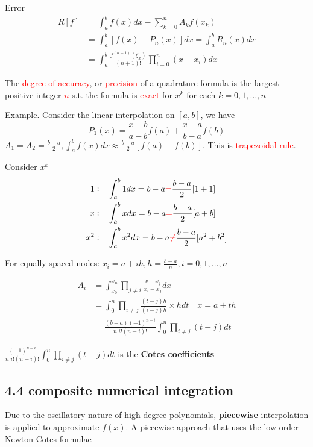 \documentclass[11pt]{article}
\begin{document}
Error
\begin{align*}
R[f]&=\int_a^bf(x)dx-\displaystyle\sum_{k=0}^nA_kf(x_k)\\
&=\int_a^b[f(x)-P_n(x)]dx=\int_a^bR_n(x)dx\\
&=\int_a^b\frac{f^{(n+1)}(\xi_x)}{(n+1)!}\displaystyle\prod_{i=0}^n(x-x_i)dx
\end{align*}

\begin{definition}
The \textcolor{red}{degree of accuracy}, or \textcolor{red}{precision} of a quadrature
formula is the largest positive integer \textcolor{red}{$n$}   s.t. 
the formula is \textcolor{red}{exact}
for $x^k$ for each $k=0,1,\dots,n$
\end{definition}

Example. Consider the linear interpolation on \([a,b]\), we have 
\begin{equation*}
P_1(x)=\frac{x-b}{a-b}f(a)+\frac{x-a}{b-a}f(b)
\end{equation*}
\(A_1=A_2=\frac{b-a}{2}, \int_a^bf(x)dx\approx\frac{b-a}{2}[f(a)+f(b)]\). This
is \textcolor{red}{trapezoidal rule}.

Consider \(x^k\)
\begin{align*}
1:\quad &\int_a^b1dx=b-a \textcolor{red}{=} \frac{b-a}{2}[1+1]\\
x:\quad &\int_a^bxdx=b-a \textcolor{red}{=}\frac{b-a}{2}[a+b]\\
x^2:\quad &\int_a^bx^2dx=b-a \textcolor{red}{\neq}  \frac{b-a}{2}[a^2+b^2]\\
\end{align*}

For equally spaced nodes: \(x_i=a+ih,h=\frac{b-a}{n}, i=0,1,\dots,n\)

\begin{align*}
A_i&=\int_{x_0}^{x_n}\displaystyle\prod_{j\neq i}\frac{x-x_j}{x_i-x_j}dx\\
&=\int_0^n\displaystyle\prod_{i\neq j}\frac{(t-j)h}{(i-j)h}\times hdt\quad x=a+th\\
&=\frac{(b-a)(-1)^{n-i}}{n\;i!(n-i)!}\int_0^n\displaystyle\prod_{i\neq j}(t-j)dt
\end{align*}

\(\frac{(-1)^{n-i}}{n\;i!(n-i)!}\int_0^n\displaystyle\prod_{i\neq j}(t-j)dt\)
is the \textbf{Cotes coefficients}

\subsection{4.4 composite numerical integration}
\label{sec:org0e55032}
Due to the oscillatory nature of high-degree polynomials, \textbf{piecewise}
interpolation is applied to approximate \(f(x)\). A piecewise approach that
uses the low-order Newton-Cotes formulae
\end{document}
